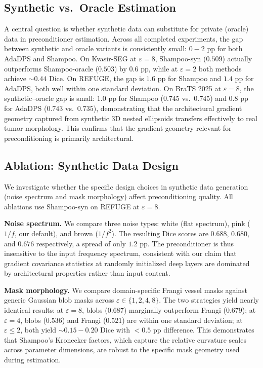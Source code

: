 \documentclass[runningheads]{llncs}
\begin{document}
\subsection{Synthetic vs.\ Oracle Estimation}
\label{subsec:ablation}

A central question is whether synthetic data can substitute for private (oracle) data in preconditioner estimation. Across all completed experiments, the gap between synthetic and oracle variants is consistently small: $0{-}2$ pp for both AdaDPS and Shampoo. On Kvasir-SEG at $\varepsilon{=}8$, Shampoo-syn ($0.509$) actually outperforms Shampoo-oracle ($0.503$) by $0.6$ pp, while at $\varepsilon{=}2$ both methods achieve ${\sim}0.44$ Dice. On REFUGE, the gap is $1.6$ pp for Shampoo and $1.4$ pp for AdaDPS, both well within one standard deviation. On BraTS 2025 at $\varepsilon{=}8$, the synthetic--oracle gap is small: $1.0$ pp for Shampoo ($0.745$ vs.\ $0.745$) and $0.8$ pp for AdaDPS ($0.743$ vs.\ $0.735$), demonstrating that the architectural gradient geometry captured from synthetic 3D nested ellipsoids transfers effectively to real tumor morphology. This confirms that the gradient geometry relevant for preconditioning is primarily architectural.

\subsection{Ablation: Synthetic Data Design}
\label{subsec:ablation_synth}

We investigate whether the specific design choices in synthetic data generation (noise spectrum and mask morphology) affect preconditioning quality. All ablations use Shampoo-syn on REFUGE at $\varepsilon{=}8$.

\textbf{Noise spectrum.}
We compare three noise types: white (flat spectrum), pink ($1/f$, our default), and brown ($1/f^2$). The resulting Dice scores are $0.688$, $0.680$, and $0.676$ respectively, a spread of only $1.2$ pp. The preconditioner is thus insensitive to the input frequency spectrum, consistent with our claim that gradient covariance statistics at randomly initialized deep layers are dominated by architectural properties rather than input content.

\textbf{Mask morphology.}
We compare domain-specific Frangi vessel masks against generic Gaussian blob masks across $\varepsilon\in\{1,2,4,8\}$. The two strategies yield nearly identical results: at $\varepsilon{=}8$, blobs ($0.687$) marginally outperform Frangi ($0.679$); at $\varepsilon{=}4$, blobs ($0.536$) and Frangi ($0.521$) are within one standard deviation; at $\varepsilon{\leq}2$, both yield ${\sim}0.15{-}0.20$ Dice with $<0.5$ pp difference. This demonstrates that Shampoo's Kronecker factors, which capture the relative curvature scales across parameter dimensions, are robust to the specific mask geometry used during estimation.
\end{document}

